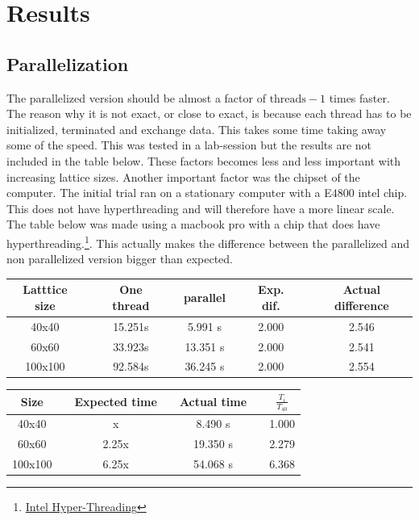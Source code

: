 \section{Results}



\subsection{Parallelization}
 
The parallelized version should be almost a factor of $\text{threads}-1$ times faster. The reason why it is not exact, or close to exact, is because each thread has to be initialized, terminated and exchange data. This takes some time taking away some of the speed. This was tested in a lab-session but the results are not included in the table below. These factors becomes less and less important with increasing lattice sizes. Another important factor was the chipset of the computer. The initial trial ran on a stationary computer with a E$4800$ intel chip. This does not have hyperthreading and will therefore have a more linear scale. The table below was made using a macbook pro with a chip that does have hyperthreading.\footnote{\href{https://www.intel.com/content/www/us/en/architecture-and-technology/hyper-threading/hyper-threading-technology.html}{Intel Hyper-Threading}}. 
This actually makes the difference between the parallelized and non parallelized version bigger than expected. 
 
 
\begin{center}
 	\label{tab:parallell}
 	\begin{tabularx}{\textwidth}{c X c X c X c X c}
 		\hline 
 		Latttice size && One thread && parallel && Exp. dif. && Actual difference\\ 
 		\hline
 		40x40   	&&      15.251s	&&		5.991 s 	&&	2.000	&&	2.546	\\  
 		60x60   	&&      33.923s	&&		13.351 s	&&	2.000	&&	2.541	\\
 		100x100   	&&      92.584s	&&		36.245 s	&&	2.000	&&	2.554	\\
 		\hline
 	\end{tabularx}
\end{center}
 
 
\begin{center}
 	\label{tab:expected-time}
 	\begin{tabularx}{\textwidth}{c X c X c X c}
 		\hline 
 		Size && Expected time && Actual time && $\frac{T_{i}}{T_{40}}$\\ 
 		\hline
 		40x40   	&&      x		&&		8.490 s 	&&	1.000	\\  
 		60x60   	&&      2.25x	&&		19.350 s	&&	2.279	\\
 		100x100   	&&      6.25x	&&		54.068 s	&&	6.368	\\
 		\hline
 	\end{tabularx}
\end{center}
 


